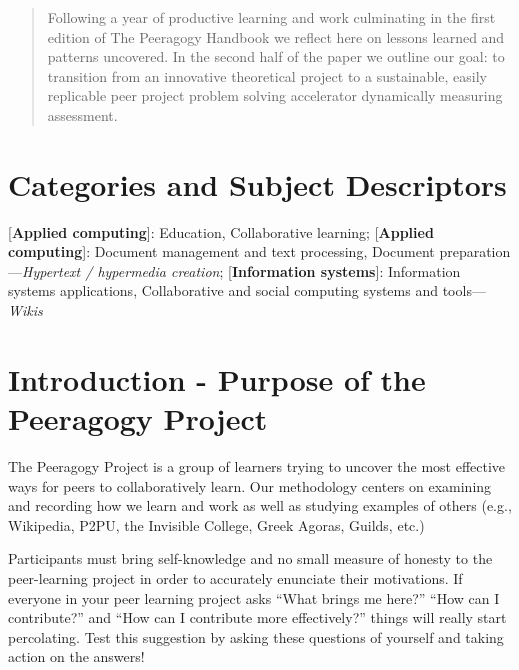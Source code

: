 \documentclass{acm_proc_article-sp}
\begin{document}

\maketitle
\begin{abstract}

Following a year of productive learning and work culminating in the first edition of The Peeragogy Handbook we reflect here on lessons learned and patterns uncovered. In the second half of the paper we outline our goal: to transition from an innovative theoretical project to a sustainable, easily replicable peer project problem solving accelerator dynamically measuring assessment.

\end{abstract}

%
%
%
%

\section*{Categories and Subject Descriptors}
[{\bf Applied computing}]: {Education}, {Collaborative learning};
[{\bf Applied computing}]: {Document management and text processing}, {Document preparation}---\emph{Hypertext / hypermedia creation};
[{\bf Information systems}]: {Information systems applications}, {Collaborative and social computing systems and tools}---\emph{Wikis}



%
%
%
%

\section{Introduction - Purpose of the Peeragogy Project}

The Peeragogy Project is a group of learners trying to uncover the most effective ways for peers to collaboratively learn. Our methodology centers on examining and recording how we learn and work as well as studying examples of others (e.g., Wikipedia, P2PU, the Invisible College, Greek Agoras, Guilds, etc.)

Participants must bring self-knowledge and no small measure of honesty to the peer-learning project in order to accurately enunciate their motivations. If everyone in your peer learning project asks “What brings me here?” “How can I contribute?” and “How can I contribute more effectively?” things will really start percolating. Test this suggestion by asking these questions of yourself and taking action on the answers!
\end{document}
